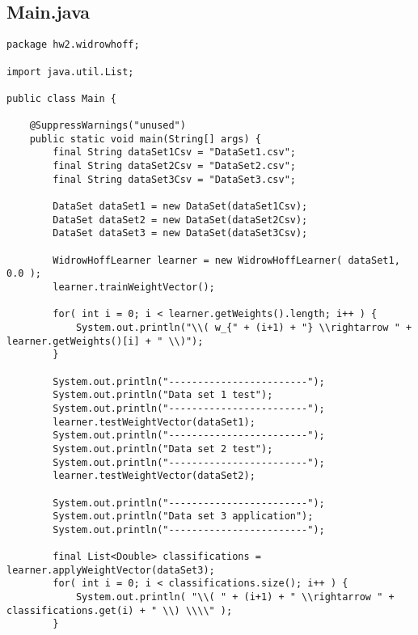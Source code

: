 \subsection{ Main.java }
\begin{lstlisting}
package hw2.widrowhoff;

import java.util.List;

public class Main {

	@SuppressWarnings("unused")
	public static void main(String[] args) {
		final String dataSet1Csv = "DataSet1.csv";
		final String dataSet2Csv = "DataSet2.csv";
		final String dataSet3Csv = "DataSet3.csv";
		
		DataSet dataSet1 = new DataSet(dataSet1Csv);
		DataSet dataSet2 = new DataSet(dataSet2Csv);
		DataSet dataSet3 = new DataSet(dataSet3Csv);
		
		WidrowHoffLearner learner = new WidrowHoffLearner( dataSet1, 0.0 );
		learner.trainWeightVector();
		
		for( int i = 0; i < learner.getWeights().length; i++ ) {
			System.out.println("\\( w_{" + (i+1) + "} \\rightarrow " + learner.getWeights()[i] + " \\)");
		}
		
		System.out.println("------------------------");
		System.out.println("Data set 1 test");
		System.out.println("------------------------");
		learner.testWeightVector(dataSet1);
		System.out.println("------------------------");
		System.out.println("Data set 2 test");
		System.out.println("------------------------");
		learner.testWeightVector(dataSet2);
		
		System.out.println("------------------------");
		System.out.println("Data set 3 application");
		System.out.println("------------------------");
		
		final List<Double> classifications = learner.applyWeightVector(dataSet3);
		for( int i = 0; i < classifications.size(); i++ ) {
			System.out.println( "\\( " + (i+1) + " \\rightarrow " + classifications.get(i) + " \\) \\\\" );
		}
		

\end{lstlisting}
